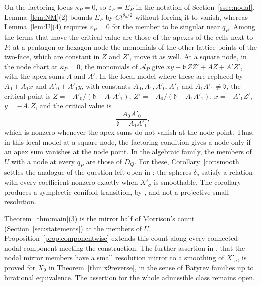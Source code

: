 On the factoring locus $\kappa_P=0$, so $\varepsilon_P=E_P$ in the notation of Section~\ref{ssec:nodal}.
Lemma~\ref{lem:NM}(2) bounds $E_P$ by $Ct^{\theta_0/2}$ without forcing it to vanish, whereas Lemma~\ref{lem:U}(4)
requires $\varepsilon_P=0$ for the member to be singular near $q_P$. Among the terms that move the
critical value are those of the apexes of the cells next to $P$; at a pentagon or hexagon node the monomials of the other
lattice points of the two-face, which are constant in $Z$ and $Z'$, move it as well. At a square node, in the node chart
at $\kappa_P=0$, the monomials of $\mathcal A_P$ give $xy+\mathfrak b\,ZZ'+AZ+A'Z'$, with the apex sums $A$ and $A'$. In
the local model where these are replaced by $A_0+A_1x$ and $A'_0+A'_1y$, with constants $A_0,A_1,A'_0,A'_1$ and
$A_1A'_1\neq\mathfrak b$, the critical point is $Z=-A'_0/(\mathfrak b-A_1A'_1)$, $Z'=-A_0/(\mathfrak b-A_1A'_1)$,
$x=-A'_1Z'$, $y=-A_1Z$, and the critical value is
\[
-\frac{A_0A'_0}{\mathfrak b-A_1A'_1},
\]
which is nonzero whenever the apex sums do not vanish at the node point. Thus, in this local model at a square node,
the factoring condition gives a node only if an apex sum vanishes at the node point. In the algebraic family, the
members of $U$ with a node at every $q_P$ are those of $D_Q$. For these,
Corollary~\ref{cor:smooth} settles the analogue of the question left open in \cite[\S3]{BK10}: the spheres $\delta_q$
satisfy a relation with every coefficient nonzero exactly when $X'_\sigma$ is smoothable. The corollary produces a
symplectic conifold transition, by \cite[Thm.~2.9]{STY}, and not a projective small resolution.

Theorem~\ref{thm:main}(3) is the mirror half of Morrison's count (Section~\ref{sec:statements}) at the members of $U$.
Proposition~\ref{prop:componentwise} extends this count along every connected nodal component meeting the construction.
The further assertion in \cite[\S3.1]{Mor99}, that the nodal mirror members have a small resolution mirror to a smoothing
of $X'_\sigma$, is proved for $X_9$ in Theorem~\ref{thm:x9reverse},
in the sense of Batyrev families up to birational equivalence. The assertion
for the whole admissible class remains open.

